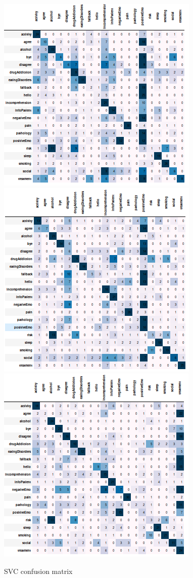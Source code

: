 \documentclass[11pt]{article}
\begin{document}
\begin{figure}[h]
	\centering
	\includegraphics[scale=0.3]{lsvc_0.png}
	\includegraphics[scale=0.3]{lsvc_1.png}
	\includegraphics[scale=0.3]{lsvc_2.png}
	\caption{SVC confusion matrix}
\label{lda_gm_cm}
\end{figure}
\FloatBarrier
\end{document}
